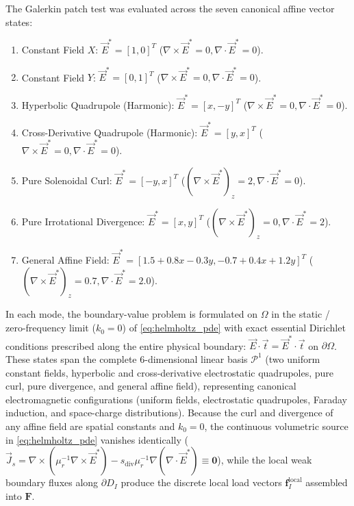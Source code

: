 \documentclass[VANCOUVER,Times1COL]{WileyNJD-v5}
\begin{document}
The Galerkin patch test was evaluated across the seven canonical affine vector states:
\begin{enumerate}
    \item Constant Field $X$: $\vec{E}^* = [1, 0]^T$ ($\nabla \times \vec{E}^* = 0, \nabla \cdot \vec{E}^* = 0$).
    \item Constant Field $Y$: $\vec{E}^* = [0, 1]^T$ ($\nabla \times \vec{E}^* = 0, \nabla \cdot \vec{E}^* = 0$).
    \item Hyperbolic Quadrupole (Harmonic): $\vec{E}^* = [x, -y]^T$ ($\nabla \times \vec{E}^* = 0, \nabla \cdot \vec{E}^* = 0$).
    \item Cross-Derivative Quadrupole (Harmonic): $\vec{E}^* = [y, x]^T$ ($\nabla \times \vec{E}^* = 0, \nabla \cdot \vec{E}^* = 0$).
    \item Pure Solenoidal Curl: $\vec{E}^* = [-y, x]^T$ ($(\nabla \times \vec{E}^*)_z = 2, \nabla \cdot \vec{E}^* = 0$).
    \item Pure Irrotational Divergence: $\vec{E}^* = [x, y]^T$ ($(\nabla \times \vec{E}^*)_z = 0, \nabla \cdot \vec{E}^* = 2$).
    \item General Affine Field: $\vec{E}^* = [1.5 + 0.8x - 0.3y, -0.7 + 0.4x + 1.2y]^T$ ($(\nabla \times \vec{E}^*)_z = 0.7, \nabla \cdot \vec{E}^* = 2.0$).
\end{enumerate}

In each mode, the boundary-value problem is formulated on $\Omega$ in the static / zero-frequency limit ($k_0 = 0$) of \eqref{eq:helmholtz_pde} with exact essential Dirichlet conditions prescribed along the entire physical boundary: $\vec{E} \cdot \vec{t} = \vec{E}^* \cdot \vec{t}$ on $\partial\Omega$. These states span the complete 6-dimensional linear basis $\mathcal{P}^1$ (two uniform constant fields, hyperbolic and cross-derivative electrostatic quadrupoles, pure curl, pure divergence, and general affine field), representing canonical electromagnetic configurations (uniform fields, electrostatic quadrupoles, Faraday induction, and space-charge distributions). Because the curl and divergence of any affine field are spatial constants and $k_0 = 0$, the continuous volumetric source in \eqref{eq:helmholtz_pde} vanishes identically ($\vec{J}_s = \nabla \times (\mu_r^{-1}\nabla\times\vec{E}^*) - s_{\mathrm{div}}\mu_r^{-1}\nabla(\nabla\cdot\vec{E}^*) \equiv \mathbf{0}$), while the local weak boundary fluxes along $\partial D_I$ produce the discrete local load vectors $\mathbf{f}_I^{\mathrm{local}}$ assembled into $\mathbf{F}$.
\end{document}
